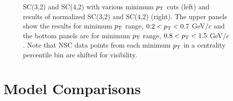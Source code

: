 \documentclass[ALICE,manyauthors]{cernphprep}
\begin{document}
\begin{figure}[p]
\begin{center}
        \caption{SC(3,2) and SC(4,2) with various minimum $p_{\rm T}$ cuts (left) and results of normalized SC(3,2) and SC(4,2) (right). The upper panels show the results for minimum $p_{\rm T}$ range, $0.2<p_{\rm T}<0.7$ GeV$/c$ and the bottom panels are for minimum $p_{\rm T}$ range, $0.8<p_{\rm T}<1.5$ GeV$/c$. Note that NSC data points from each minimum $p_{\rm T}$ in a centrality percentile bin are shifted for visibility.}
        \label{fig:Figure_2}
        \end{center}   
\end{figure}
 
\newpage
\section{Model Comparisons}
\label{sec:theory}
\end{document}
